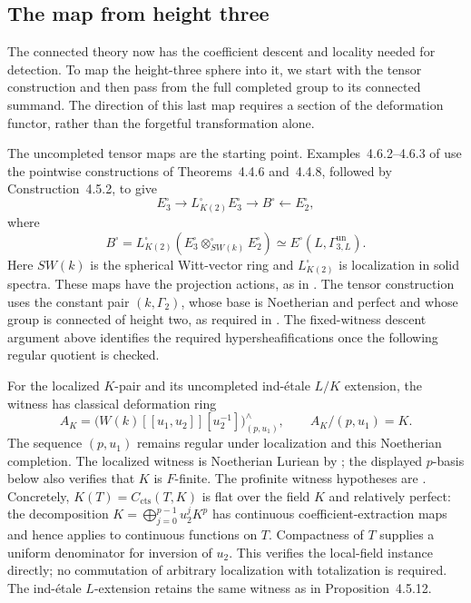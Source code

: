 \documentclass[11pt]{article}
\numberwithin{equation}{section}
\theoremstyle{definition}
\theoremstyle{remark}
\begin{document}
\subsection{The map from height three}

The connected theory now has the coefficient descent and locality needed
for detection. To map the height-three sphere into it, we start with the
tensor construction and then pass from the full completed group to its
connected summand. The direction of this last map requires a section of
the deformation functor, rather than the forgetful transformation alone.

The uncompleted tensor maps are the starting point. Examples~4.6.2--4.6.3 of
\cite{BMR2026} use the pointwise constructions of Theorems~4.4.6 and~4.4.8,
followed by Construction~4.5.2, to give
\[
 E_3^{\square}\longrightarrow L_{K(2)}^{\square}E_3^{\square}
   \longrightarrow B^{\square}\longleftarrow E_2^{\square},
\]
where
\[
 B^{\square}
 =L_{K(2)}^{\square}
    (E_3^{\square}\otimes_{SW(k)}^{\square}E_2^{\square})
 \simeq E^{\square}(L,\Gamma^{\mathrm{un}}_{3,L}).
\]
Here \(SW(k)\) is the spherical Witt-vector ring and
\(L_{K(2)}^{\square}\) is localization in solid spectra. These maps have
the projection actions, as in \cite[(5.2.2)--(5.2.3)]{BMR2026}.
The tensor construction uses the constant pair \((k,\Gamma_2)\), whose
base is Noetherian and perfect and whose group is connected of height
two, as required in \cite[Construction~4.4.7]{BMR2026}. The fixed-witness
descent argument above identifies the required hypersheafifications once
the following regular quotient is checked.

For the localized $K$-pair and its uncompleted ind-\'{e}tale $L/K$
extension, the witness has classical deformation ring
\[
 A_K=\bigl(W(k)[[u_1,u_2]][u_2^{-1}]\bigr)^{\wedge}_{(p,u_1)},
 \qquad A_K/(p,u_1)=K.
\]
The sequence $(p,u_1)$ remains regular under localization and this
Noetherian completion. The localized witness is Noetherian Luriean
by \cite[Proposition~4.4.4 and Remark~4.2.2]{BMR2026}; the displayed
$p$-basis below also verifies that $K$ is $F$-finite. The profinite witness hypotheses are
\cite[Propositions~4.5.9, 4.5.10, and 4.5.12, Definition~4.5.11,
and Examples~4.6.1--4.6.3]{BMR2026}.
Concretely, $K(T)=C_{\mathrm{cts}}(T,K)$ is flat over the field $K$ and
relatively perfect: the decomposition
$K=\bigoplus_{j=0}^{p-1}u_2^jK^p$ has continuous coefficient-extraction
maps and hence applies to continuous functions on $T$.
Compactness of $T$ supplies a uniform denominator for inversion of
$u_2$.  This verifies the local-field instance directly; no commutation
of arbitrary localization with totalization is required.
The ind-\'{e}tale $L$-extension retains the same witness as in
Proposition~4.5.12.
\end{document}
